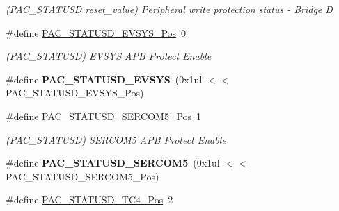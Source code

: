 \begin{DoxyCompactItemize}
\begin{DoxyCompactList}\small\item\em (P\+A\+C\+\_\+\+S\+T\+A\+T\+U\+S\+D reset\+\_\+value) Peripheral write protection status -\/ Bridge D \end{DoxyCompactList}\item 
\hypertarget{group___s_a_m_l21___p_a_c_ga4b3cfd960f7419615f8b05732adb3c5b}{}\#define \hyperlink{group___s_a_m_l21___p_a_c_ga4b3cfd960f7419615f8b05732adb3c5b}{P\+A\+C\+\_\+\+S\+T\+A\+T\+U\+S\+D\+\_\+\+E\+V\+S\+Y\+S\+\_\+\+Pos}~0\label{group___s_a_m_l21___p_a_c_ga4b3cfd960f7419615f8b05732adb3c5b}

\begin{DoxyCompactList}\small\item\em (P\+A\+C\+\_\+\+S\+T\+A\+T\+U\+S\+D) E\+V\+S\+Y\+S A\+P\+B Protect Enable \end{DoxyCompactList}\item 
\hypertarget{group___s_a_m_l21___p_a_c_ga64922778d3a96b30c5b21d8bfeab20a2}{}\#define {\bfseries P\+A\+C\+\_\+\+S\+T\+A\+T\+U\+S\+D\+\_\+\+E\+V\+S\+Y\+S}~(0x1ul $<$$<$ P\+A\+C\+\_\+\+S\+T\+A\+T\+U\+S\+D\+\_\+\+E\+V\+S\+Y\+S\+\_\+\+Pos)\label{group___s_a_m_l21___p_a_c_ga64922778d3a96b30c5b21d8bfeab20a2}

\item 
\hypertarget{group___s_a_m_l21___p_a_c_ga35f1c5c15a4194e879bd5dbbe6171f2f}{}\#define \hyperlink{group___s_a_m_l21___p_a_c_ga35f1c5c15a4194e879bd5dbbe6171f2f}{P\+A\+C\+\_\+\+S\+T\+A\+T\+U\+S\+D\+\_\+\+S\+E\+R\+C\+O\+M5\+\_\+\+Pos}~1\label{group___s_a_m_l21___p_a_c_ga35f1c5c15a4194e879bd5dbbe6171f2f}

\begin{DoxyCompactList}\small\item\em (P\+A\+C\+\_\+\+S\+T\+A\+T\+U\+S\+D) S\+E\+R\+C\+O\+M5 A\+P\+B Protect Enable \end{DoxyCompactList}\item 
\hypertarget{group___s_a_m_l21___p_a_c_ga773e13d12198270f376724299ef4ea7d}{}\#define {\bfseries P\+A\+C\+\_\+\+S\+T\+A\+T\+U\+S\+D\+\_\+\+S\+E\+R\+C\+O\+M5}~(0x1ul $<$$<$ P\+A\+C\+\_\+\+S\+T\+A\+T\+U\+S\+D\+\_\+\+S\+E\+R\+C\+O\+M5\+\_\+\+Pos)\label{group___s_a_m_l21___p_a_c_ga773e13d12198270f376724299ef4ea7d}

\item 
\hypertarget{group___s_a_m_l21___p_a_c_gaa339c426b485f158181eb85b0abb1acd}{}\#define \hyperlink{group___s_a_m_l21___p_a_c_gaa339c426b485f158181eb85b0abb1acd}{P\+A\+C\+\_\+\+S\+T\+A\+T\+U\+S\+D\+\_\+\+T\+C4\+\_\+\+Pos}~2\label{group___s_a_m_l21___p_a_c_gaa339c426b485f158181eb85b0abb1acd}


\end{DoxyCompactItemize}
